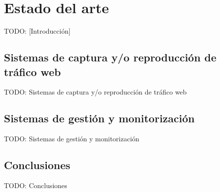 \chapter{Estado del arte\label{cap:estado_del_arte}}

TODO: [Introducción]


\section{Sistemas de captura y/o reproducción de tráfico web\label{sec:eda:sistemas_captura_reproducccion}}

TODO: Sistemas de captura y/o reproducción de tráfico web


\section{Sistemas de gestión y monitorización\label{sec:eda:sistemas_gestion_monitorizacion}}

TODO: Sistemas de gestión y monitorización


\section{Conclusiones\label{sec:eda:conclusiones}}

TODO: Conclusiones